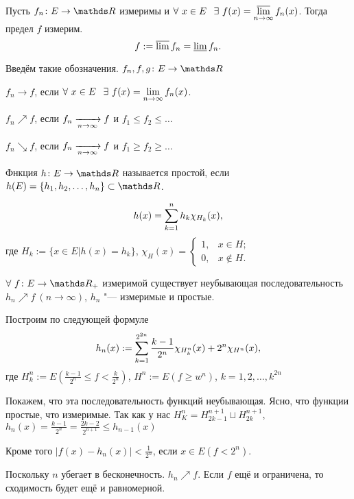 \begin{Sl}\label{avaSl3}
  Пусть $f_n\colon E\to\R$ измеримы и $\forall\ x\in E\pau \exists\ f(x) = \varlimsup\limits_{n\to\infty} f_n(x)$. Тогда предел $f$ измерим.
  \[ f :=\varlimsup f_n = \varliminf f_n.\]
\end{Sl}

  Введём такие обозначения.
  $f_n,f,g\colon E\to\R$
  \begin{roItems}
   \item $f_n\to f$, если $\forall\ x\in E\pau \exists\ f(x) = \lim\limits_{n\to\infty} f_n(x)$.
   \item $f_n\nearrow f$, если $f_n\xrightarrow[n\rightarrow\infty]{} f$ и $f_1\le f_2\le\ldots$
   \item $f_n\searrow f$, если $f_n\xrightarrow[n\rightarrow\infty]{} f$ и $f_1\ge f_2\ge\ldots$
\end{roItems}

\begin{Def}
  Фнкция $h\colon E\to \R$ называется простой, если $h(E) = \{h_1,h_2,\dots,h_n\}\subset \R$.
\end{Def}

\[h(x) = \sum\limits_{k = 1}^{n} h_k \chi_{H_k}(x),\]
где $H_k :=\big\{x\in E\big|h(x)=h_k\big\}$, $\chi_H(x) = \begin{cases} 1,&x\in H;\\ 0,&x \not\in H.\end{cases}$

\begin{The}%
  $\forall\ f\colon E\to \R_+$ измеримой существует неубывающая последовательность $h_n\nearrow f\ (n\to\infty)$, $h_n$ "--- измеримые и простые.
\end{The}%

\begin{The}
Построим по следующей формуле
 \[ h_n(x):=\sum\limits_{k = 1}^{2^{2n}}\frac{k-1}{2^n}\chi_{H_k^n}(x) + 2^n\chi_{H^n}(x),\]
где $H_k^n := E\left(\frac{k-1}{2^n}\le f< \frac k{2^n}\right)$, $H^n:=E(f\ge w^n)$, $k=1,2,\ldots,k^{2n}$

Покажем, что эта последовательность функций неубывающая. Ясно, что функции простые, что измеримые.
Так как у нас $H_K^n = H_{2k-1}^{n+1} \sqcup H_{2k}^{n+1}$, $h_n(x) = \frac{k-1}{2^n} = \frac{2k-2}{2^{n+1}}\le h_{n-1}(x)$

Кроме того $\big|f(x)-h_n(x)\big|<\frac1{2^n}$, если $x\in E(f<2^n)$.

Поскольку $n$ убегает в бесконечность. $h_n\nearrow f$. Если $f$ ещё и ограничена, то сходимость будет ещё и равномерной.
\end{The}

